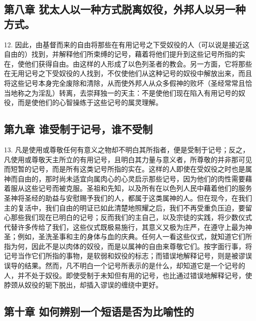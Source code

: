 
\subsection{第八章 犹太人以一种方式脱离奴役，外邦人以另一种方式。}

12. 因此，由基督而来的自由将那些在有用记号之下受奴役的人（可以说是接近这自由的）找到，并解释他们所束缚的记号，藉着将他们提升到这些记号所指的实在，使他们获得自由。由这样的人形成了以色列圣者的教会。另一方面，它将那些在无用记号之下受奴役的人找到，不仅使他们从这种记号的奴役中解放出来，而且将这些记号本身完全废除和清除，从而使外邦人从众多假神的败坏（圣经常常且恰当地称之为淫乱）转离，去崇拜独一的天主：不是使他们现在陷入有用记号的奴役，而是使他们的心智操练于这些记号的属灵理解。\par


\subsection{第九章 谁受制于记号，谁不受制}

13. 凡是使用或尊敬任何有意义之物却不明白其所指者，便是受制于记号；反之，凡使用或尊敬天主所立的有用记号，且明白其力量与意义者，所尊敬的并非那可见而短暂的记号，而是所有这类记号所指的实在。这样的人即使在受奴役之时也是属神而自由的，那时尚未适宜向属肉心的心灵启示那些记号，因为他们的肉性需要藉着服从这些记号而被克服。圣祖和先知，以及所有在以色列人民中藉着他们的服务圣神将圣经的助益与安慰赐予我们的人，都属于这类属神的人。但在现今，在我们主的复活中，我们自由的明证已如此清楚地照耀之后，我们不再受重负压迫，要留心那些我们现在已明白的记号；反而我们的主自己，以及宗徒的实践，将少数仪式代替许多传给了我们，这些仪式既极易施行，其意义又极为庄严，在遵守上最为神圣；例如，圣洗圣事和主的身体与血的庆典。任何人一看这些仪式，就知道它们所指为何，因此不是以肉体的奴役，而是以属神的自由来尊敬它们。按字面行事，将记号当作它们所指的事物，是软弱和奴役的标志；而错误地解释记号，则是被谬误误导的结果。然而，凡不明白一个记号所表示的是什么，却知道它是一个记号的人，并不处于奴役。即使受制于未知但有用的记号，也比通过错误地解释记号，使脖颈从奴役的轭下脱出，却插入谬误的缠绕中更好。\par


\subsection{第十章 如何辨别一个短语是否为比喻性的}

